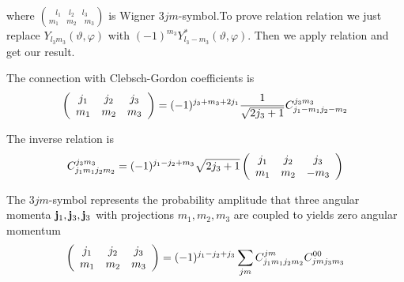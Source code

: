 %
where $\binom{l_1\quad l_2\quad l_3}{m_1\quad m_2\quad m_3}$ is Wigner
$3jm$-symbol.To prove relation relation  we just replace
$Y_{l_3m_3}(\vartheta,\varphi)$ with
$(-1)^{m_3}Y_{l_3-m_3}^{*}(\vartheta,\varphi)$. Then we apply
relation  and get our result.
%
\par{ The connection with Clebsch-Gordon coefficients is}
\begin{equation}
\tjm{j_1}{m_1}{j_2}{m_2}{j_3}{m_3}=(-1)^{j_3+m_3+2j_1}\frac{1}{\sqrt{2j_3+1}}C_{j_1-m_1j_2-m_2}^{j_3m_3}
\end{equation}
\par{The inverse relation is}
\begin{equation}
C_{j_1m_1j_2m_2}^{j_3m_3}=(-1)^{j_1-j_2+m_3}\sqrt{2j_3+1}\tjm{j_1}{m_1}{j_2}{m_2}{j_3}{-m_3}
\end{equation}
\par{The $3jm$-symbol represents the probability amplitude that three angular
momenta ${\bf j}_1,{\bf j}_3,{\bf j}_3$ with projections $m_1,m_2,m_3$ are
coupled to yields zero angular momentum}
\begin{equation}
\tjm{j_1}{m_1}{j_2}{m_2}{j_3}{m_3}=(-1)^{j_1-j_2+j_3}\sum_{jm}C_{j_1m_1j_2m_2}^{jm}C_{jmj_3m_3}^{00}
\end{equation}
%
